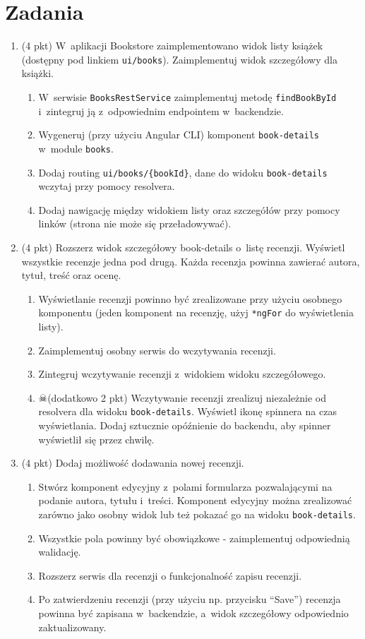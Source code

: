\documentclass[12pt]{article}
\begin{document}
    \section*{Zadania}
    \begin{enumerate}

		\item
			(4 pkt) W~aplikacji Bookstore zaimplementowano widok listy książek (dostępny pod linkiem \texttt{ui/books}). Zaimplementuj widok szczegółowy dla książki.
			\begin{enumerate}
				\item W~serwisie \texttt{BooksRestService} zaimplementuj metodę \texttt{findBookById} i~zintegruj ją z~odpowiednim endpointem w~backendzie.
				\item Wygeneruj (przy użyciu Angular CLI) komponent \texttt{book-details} w~module \texttt{books}.
				\item Dodaj routing \texttt{ui/books/\{bookId\}}, dane do widoku \texttt{book-details} wczytaj przy pomocy resolvera.
				\item Dodaj nawigację między widokiem listy oraz szczegółów przy pomocy linków (strona nie może się przeładowywać).
			\end{enumerate}

		\item
			(4 pkt) Rozszerz widok szczegółowy book-details o~listę recenzji. Wyświetl wszystkie recenzje jedna pod drugą. Każda recenzja powinna zawierać autora, tytuł, treść oraz ocenę.
			\begin{enumerate}
				\item Wyświetlanie recenzji powinno być zrealizowane przy użyciu osobnego komponentu (jeden komponent na recenzję, użyj \texttt{*ngFor} do wyświetlenia listy).
				\item Zaimplementuj osobny serwis do wczytywania recenzji.
				\item Zintegruj wczytywanie recenzji z~widokiem widoku szczegółowego.
				\item $\skull$(dodatkowo 2 pkt) Wczytywanie recenzji zrealizuj niezależnie od resolvera dla widoku \texttt{book-details}. Wyświetl ikonę spinnera na czas wyświetlania. Dodaj sztucznie opóźnienie do backendu, aby spinner wyświetlił się przez chwilę.
			\end{enumerate}

		\item
			(4 pkt) Dodaj możliwość dodawania nowej recenzji.
			\begin{enumerate}
				\item Stwórz komponent edycyjny z~polami formularza pozwalającymi na podanie autora, tytułu i~treści. Komponent edycyjny można zrealizować zarówno jako osobny widok lub też pokazać go na widoku \texttt{book-details}.
				\item Wszystkie pola powinny być obowiązkowe - zaimplementuj odpowiednią walidację.
				\item Rozszerz serwis dla recenzji o funkcjonalność zapisu recenzji.
				\item Po zatwierdzeniu recenzji (przy użyciu np. przycisku ``Save'') recenzja powinna być zapisana w~backendzie, a~widok szczegółowy odpowiednio zaktualizowany.
			\end{enumerate}


\end{enumerate}
\end{document}
